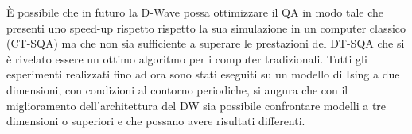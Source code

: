 È possibile che in futuro la D-Wave possa ottimizzare il QA in modo tale che presenti uno speed-up rispetto rispetto la sua simulazione in un computer classico (CT-SQA) ma che non sia sufficiente a superare le prestazioni del DT-SQA che si è rivelato essere un ottimo algoritmo per i computer tradizionali. Tutti gli esperimenti realizzati fino ad ora sono stati eseguiti su un modello di Ising a due dimensioni, con condizioni al contorno periodiche, si augura che con il miglioramento dell'architettura del DW sia possibile confrontare modelli a tre dimensioni o superiori e che possano avere risultati differenti.
